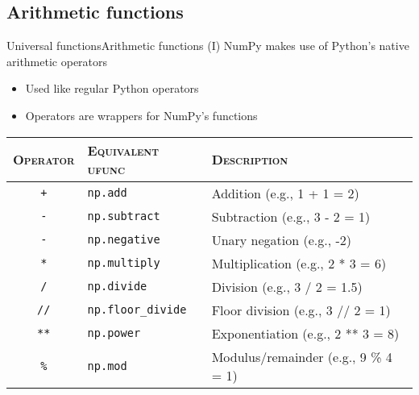 \documentclass[10pt,compress]{beamer} %
\begin{document}
\subsection{Arithmetic functions}

\begin{frame}{Universal functions}{Arithmetic functions (I)}
	NumPy makes use of Python's native arithmetic operators
	\begin{itemize}
		\item Used like regular Python operators
		\item Operators are wrappers for NumPy's functions
	\end{itemize}

	\bigskip

	\footnotesize{
    \begin{tabular}{cll}\hline
       \textsc{Operator} & \textsc{Equivalent ufunc} & \textsc{Description}\\ \hline
	   \texttt{+} & \texttt{np.add} & Addition (e.g., 1 + 1 = 2) \\
	   \texttt{-} & \texttt{np.subtract} & Subtraction (e.g., 3 - 2 = 1)\\
	   \texttt{-} & \texttt{np.negative} & Unary negation (e.g., -2)\\
	   \texttt{*} & \texttt{np.multiply} & Multiplication (e.g., 2 * 3 = 6)\\
	   \texttt{/} & \texttt{np.divide} & Division (e.g., 3 / 2 = 1.5)\\
	   \texttt{//} & \texttt{np.floor\_divide} & Floor division (e.g., 3 // 2 = 1) \\
	   \texttt{**} & \texttt{np.power} & Exponentiation (e.g., 2 ** 3 = 8)\\
	   \texttt{\%} & \texttt{np.mod} & Modulus/remainder (e.g., 9 \% 4 = 1) \\\hline
    \end{tabular}
	}
\end{frame}
\end{document}
